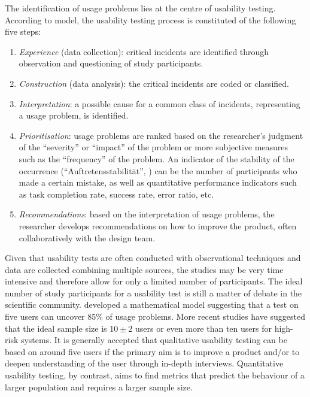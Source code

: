 The identification of usage problems lies at the centre of usability testing. According to  model, the usability testing process is constituted of the following five steps:
\begin{enumerate}
    \item \textit{Experience} (data collection): critical incidents are identified through observation and questioning of study participants.
    \item \textit{Construction} (data analysis): the critical incidents are coded or classified.
    \item \textit{Interpretation}: a possible cause for a common class of incidents, representing a usage problem, is identified.
    \item \textit{Prioritisation}: usage problems are ranked based on the researcher’s judgment of the ``severity'' or ``impact'' of the problem or more subjective measures such as the ``frequency'' of the problem. An indicator of the stability of the occurrence (``Auftretensstabilität'', \cite[145]{seewald2004kritischen}) can be the number of participants who made a certain mistake, as well as quantitative performance indicators such as task completion rate, success rate, error ratio, etc.
    \item \textit{Recommendations}: based on the interpretation of usage problems, the researcher develops recommendations on how to improve the product, often collaboratively with the design team.
\end{enumerate}
Given that usability tests are often conducted with observational techniques and data are collected combining multiple sources, the studies may be very time intensive and therefore allow for only a limited number of participants. The ideal number of study participants for a usability test is still a matter of debate in the scientific community. \citet{nielsen1993mathematical} developed a mathematical model suggesting that a test on five users can uncover 85\% of usage problems. More recent studies have suggested that the ideal sample size is $10\pm2$ users \citep{hwang2010number} or even more than ten users \citep{schmettow2013many} for high-risk systems. It is generally accepted that qualitative usability testing can be based on around five users if the primary aim is to improve a product and/or to deepen understanding of the user through in-depth interviews. Quantitative usability testing, by contrast, aims to find metrics that predict the behaviour of a larger population and requires a larger sample size.
